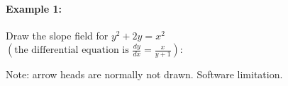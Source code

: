 \documentclass[../revisedmain.tex]{subfiles}
\begin{document}
	\paragraph{Example 1:} Draw the slope field for $y^2+2y=x^2$\\ $\left(\text{the differential equation is } \displaystyle\frac{dy}{dx}=\displaystyle\frac{x}{y+1}\right)$:
	\begin{center}
		\def\length{sqrt(1+(x-y)^2)}
		\newline Note: arrow heads are normally not drawn. Software limitation.
	\end{center}
\end{document}
